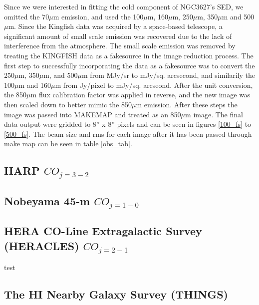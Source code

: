 Since we were interested in fitting the cold component of NGC3627's SED, we omitted the 70$\mu$m emission, and used the 100$\mu$m, 160$\mu$m, 250$\mu$m, 350$\mu$m and 500$\mu$m.  Since the Kingfish data was acquired by a space-based telescope, a significant amount of small scale emission was recovered due to the lack of interference from the atmosphere.  The small scale emission was removed by treating the KINGFISH data as a fakesource in the image reduction process.  The first step to successfully incorporating the data as a fakesource was to convert the 250$\mu$m, 350$\mu$m, and 500$\mu$m from MJy/sr to mJy/sq. arcsecond, and similarily the 100$\mu$m and 160$\mu$m from Jy/pixel to mJy/sq. arcseond.   After the unit conversion, the 850$\mu$m flux calibration factor was applied in reverse, and the new image was then scaled down to better mimic the 850$\mu$m emission.  After these steps the image was passed into MAKEMAP and treated as an 850$\mu$m image.  The final data output were gridded to 8'' x 8'' pixels and can be seen in figures \ref{100_fs} to \ref{500_fs}.  The beam size and rms for each image after it has been passed through make map can be seen in table \ref{obs_tab}.

\subsection{HARP $CO_{j=3-2}$}

\subsection{Nobeyama 45-m $CO_{j=1-0}$}

\subsection{HERA CO-Line Extragalactic Survey (HERACLES) $CO_{j=2-1}$}
test
\subsection{The HI Nearby Galaxy Survey (THINGS)}




